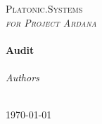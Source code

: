 \begin{titlepage}
  \begin{center}

    \textsc{\LARGE Platonic.Systems}\\[1.5cm]
    \textsc{\LARGE \textit{for Project Ardana}}\\[0.5cm]

    \HRule\\[0.4cm]
    {\huge \bfseries Audit\\[0.4cm]}
    \HRule\\[1.5cm]

    \emph{Authors}\\[0.1cm]
    \noindent{}\\[1cm]


    \vfill

    {\large \today \ \ \currenttime}

  \end{center}
\end{titlepage}
